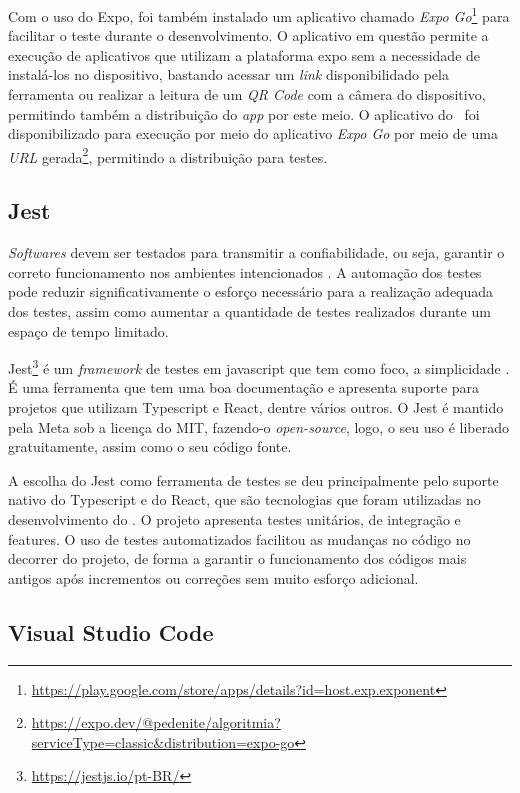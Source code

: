 Com o uso do Expo, foi também instalado um aplicativo chamado \textit{Expo Go}\footnote{\url{https://play.google.com/store/apps/details?id=host.exp.exponent}} para facilitar o teste durante o desenvolvimento. O aplicativo em questão permite a execução de aplicativos que utilizam a plataforma expo sem a necessidade de instalá-los no dispositivo, bastando acessar um \textit{link} disponibilidado pela ferramenta ou realizar a leitura de um \textit{QR Code} com a câmera do dispositivo, permitindo também a distribuição do \textit{app} por este meio. O aplicativo do \appName\ foi disponibilizado para execução por meio do aplicativo \textit{Expo Go} por meio de uma \textit{URL} gerada\footnote{\url{https://expo.dev/@pedenite/algoritmia?serviceType=classic&distribution=expo-go}}, permitindo a distribuição para testes.

\subsection{Jest}

\textit{Softwares} devem ser testados para transmitir a confiabilidade, ou seja, garantir o correto funcionamento nos ambientes intencionados \cite{test_automation}. A automação dos testes pode reduzir significativamente o esforço necessário para a realização adequada dos testes, assim como aumentar a quantidade de testes realizados durante um espaço de tempo limitado.

Jest\footnote{\url{https://jestjs.io/pt-BR/}} é um \textit{framework} de testes em javascript que tem como foco, a simplicidade \cite{jest}. É uma ferramenta que tem uma boa documentação e apresenta suporte para projetos que utilizam Typescript e React, dentre vários outros. O Jest é mantido pela Meta sob a licença do MIT, fazendo-o \textit{open-source}, logo, o seu uso é liberado gratuitamente, assim como o seu código fonte.

A escolha do Jest como ferramenta de testes se deu principalmente pelo suporte nativo do Typescript e do React, que são tecnologias que foram utilizadas no desenvolvimento do \appName. O projeto apresenta testes unitários, de integração e features. O uso de testes automatizados facilitou as mudanças no código no decorrer do projeto, de forma a garantir o funcionamento dos códigos mais antigos após incrementos ou correções sem muito esforço adicional.

\subsection{Visual Studio Code}

